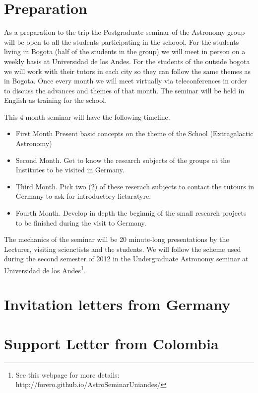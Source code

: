 \documentclass[12pt]{article}
\begin{document}
\section{Preparation}

As a preparation to the trip the Postgraduate seminar of the Astronomy
group will be open to all the students participating in the
schoool. For the students living in Bogota (half of the students in
the group) we will meet in person on a weekly basis at Universidad de
los Andes. For the students of the outside bogota we will work with
their tutors in each city so they can follow the same themes as in
Bogota. Once every month we will meet virtually via teleconferences in
order to discuss the advances and themes of that month. The seminar
will be held in English as training for the school. 

This 4-month seminar will have the following timeline.
\begin{itemize}
\item First Month Present basic concepts on the theme of the School
  (Extragalactic Astronomy)
\item Second Month. Get to know the research subjects of the groups at
  the Institutes to be visited in Germany.
\item Third Month. Pick two (2) of these reserach subjects to contact
  the tutours in Germany to ask for introductory lietaratyre.
\item Fourth Month. Develop in depth the beginnig of the small
  research projects to be finished during the visit to Germany. 
\end{itemize}

The mechanics of the seminar will be 20 minute-long presentations by the
Lecturer, visiting scienctists and the students. We will follow the
scheme used during the second semester of 2012 in the Undergraduate
Astronomy seminar at Universidad de los Andes\footnote{See this webpage for more details: http://forero.github.io/AstroSeminarUniandes/}.




\section{Invitation letters from Germany}

\section{Support Letter from Colombia}
\end{document}
